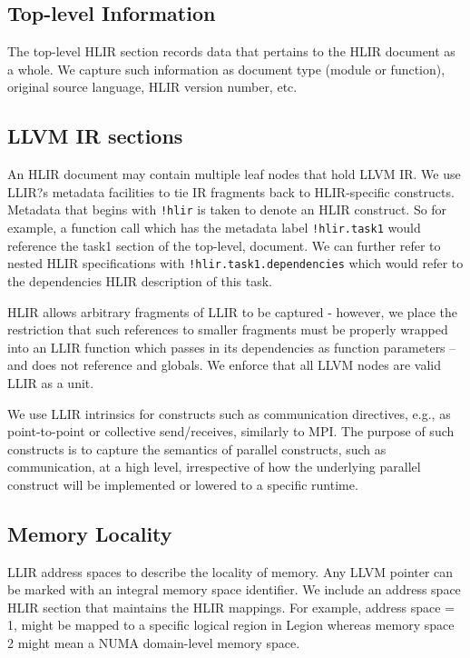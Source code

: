\documentclass[12pt]{article}
\begin{document}
\subsection{Top-level Information}

The top-level HLIR section records data that pertains to the HLIR document as a whole. We capture such information as document type (module or function), original source language, HLIR version number, etc.

\subsection{LLVM IR sections}

An HLIR document may contain multiple leaf nodes that hold LLVM IR. We use LLIR?s metadata facilities to tie IR fragments back to HLIR-specific constructs.
Metadata that begins with {\tt !hlir} is taken to denote an HLIR construct. So for example, a function call which has the metadata label {\tt !hlir.task1} would reference the task1 section of the top-level, document. We can further refer to nested HLIR specifications with {\tt !hlir.task1.dependencies} which would refer to the dependencies HLIR description of this task.

HLIR allows arbitrary fragments of LLIR to be captured - however, we place the restriction that such references to smaller fragments must be properly wrapped into an LLIR function which passes in its dependencies as function parameters -- and does not reference and globals. We enforce that all LLVM nodes are valid LLIR as a unit.

We use LLIR intrinsics for constructs such as communication directives, e.g., as point-to-point or collective send/receives, similarly to MPI. The purpose of such constructs is to capture the semantics of parallel constructs, such as communication, at a high level, irrespective of how the underlying parallel construct will be implemented or lowered to a specific runtime.

\subsection{Memory Locality}

LLIR address spaces to describe the locality of memory. Any LLVM pointer can be marked with an integral memory space identifier. We include an address space HLIR section that maintains the HLIR mappings. For example, address space = 1, might be mapped to a specific logical region in Legion whereas memory space 2 might mean a NUMA domain-level memory space.
\end{document}

